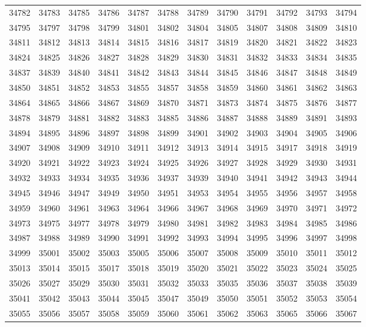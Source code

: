 \begin{center}
\begin{longtable}{llllllllllll}
34782 &34783 &34785 &34786 &34787 &34788 &34789 &34790 &34791 &34792 &34793 &34794 \\
34795 &34797 &34798 &34799 &34801 &34802 &34804 &34805 &34807 &34808 &34809 &34810 \\
34811 &34812 &34813 &34814 &34815 &34816 &34817 &34819 &34820 &34821 &34822 &34823 \\
34824 &34825 &34826 &34827 &34828 &34829 &34830 &34831 &34832 &34833 &34834 &34835 \\
34837 &34839 &34840 &34841 &34842 &34843 &34844 &34845 &34846 &34847 &34848 &34849 \\
34850 &34851 &34852 &34853 &34855 &34857 &34858 &34859 &34860 &34861 &34862 &34863 \\
34864 &34865 &34866 &34867 &34869 &34870 &34871 &34873 &34874 &34875 &34876 &34877 \\
34878 &34879 &34881 &34882 &34883 &34885 &34886 &34887 &34888 &34889 &34891 &34893 \\
34894 &34895 &34896 &34897 &34898 &34899 &34901 &34902 &34903 &34904 &34905 &34906 \\
34907 &34908 &34909 &34910 &34911 &34912 &34913 &34914 &34915 &34917 &34918 &34919 \\
34920 &34921 &34922 &34923 &34924 &34925 &34926 &34927 &34928 &34929 &34930 &34931 \\
34932 &34933 &34934 &34935 &34936 &34937 &34939 &34940 &34941 &34942 &34943 &34944 \\
34945 &34946 &34947 &34949 &34950 &34951 &34953 &34954 &34955 &34956 &34957 &34958 \\
34959 &34960 &34961 &34963 &34964 &34966 &34967 &34968 &34969 &34970 &34971 &34972 \\
34973 &34975 &34977 &34978 &34979 &34980 &34981 &34982 &34983 &34984 &34985 &34986 \\
34987 &34988 &34989 &34990 &34991 &34992 &34993 &34994 &34995 &34996 &34997 &34998 \\
34999 &35001 &35002 &35003 &35005 &35006 &35007 &35008 &35009 &35010 &35011 &35012 \\
35013 &35014 &35015 &35017 &35018 &35019 &35020 &35021 &35022 &35023 &35024 &35025 \\
35026 &35027 &35029 &35030 &35031 &35032 &35033 &35035 &35036 &35037 &35038 &35039 \\
35041 &35042 &35043 &35044 &35045 &35047 &35049 &35050 &35051 &35052 &35053 &35054 \\
35055 &35056 &35057 &35058 &35059 &35060 &35061 &35062 &35063 &35065 &35066 &35067 \\

\end{longtable}
\end{center}

